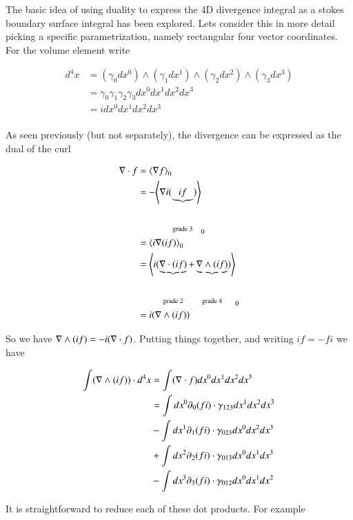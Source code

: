The basic idea of using duality to express the 4D divergence integral as a stokes boundary surface integral has been explored.  Lets consider this in more detail picking a specific parametrization, namely rectangular four vector coordinates.  For the volume element write

\begin{align*}
d^4 x 
&= ( \gamma_0 dx^0 ) \wedge ( \gamma_1 dx^1 ) \wedge ( \gamma_2 dx^2 ) \wedge ( \gamma_3 dx^3 ) \\
&= \gamma_0 \gamma_1 \gamma_2 \gamma_3 dx^0 dx^1 dx^2 dx^3 \\
&= i dx^0 dx^1 dx^2 dx^3 \\
\end{align*}

As seen previously (but not separately), the divergence can be expressed as the dual of the curl

\begin{align*}
\nabla \cdot f
&=
{\left\langle{{ \nabla f }}\right\rangle}_{0} \\
&=
-{\left\langle{{ \nabla i (\underbrace{i f}_{\text{grade 3}}) }}\right\rangle}_{0} \\
&=
{\left\langle{{ i \nabla(i f) }}\right\rangle}_{0} \\
&=
{\left\langle{{ i ( \underbrace{\nabla\cdot (i f)}_{\text{grade 2}} + \underbrace{\nabla\wedge (i f)}_{\text{grade 4}} ) }}\right\rangle}_{0} \\
&=
i (\nabla \wedge (i f)) \\
\end{align*}

So we have $\nabla \wedge (i f) = -i (\nabla \cdot f)$.  Putting things together, and writing $i f = -f i$ we have 

\begin{align*}
\int (\nabla \wedge (i f)) \cdot d^4 x
&= 
\int (\nabla \cdot f) dx^0 dx^1 dx^2 dx^3 \\
&=
\int dx^0 \partial_0 (f i) \cdot \gamma_{123} dx^1 dx^2 dx^3 \\
&-\int dx^1 \partial_1 (f i) \cdot \gamma_{023} dx^0 dx^2 dx^3 \\
&+\int dx^2 \partial_2 (f i) \cdot \gamma_{013} dx^0 dx^1 dx^3 \\
&-\int dx^3 \partial_3 (f i) \cdot \gamma_{012} dx^0 dx^1 dx^2 \\
\end{align*}

It is straightforward to reduce each of these dot products.  For example

